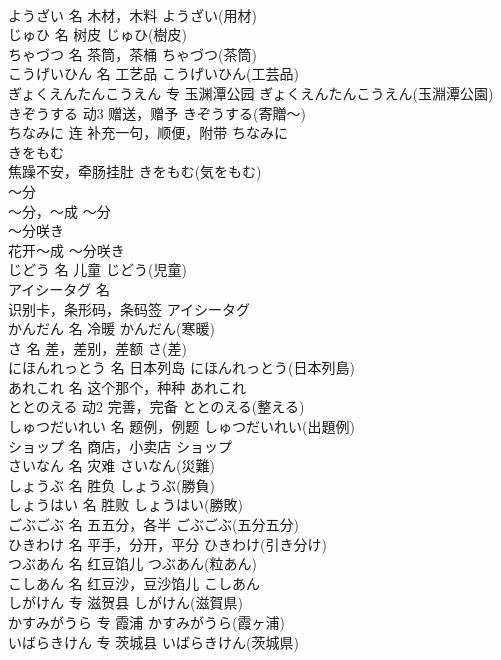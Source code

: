 \documentclass[8pt]{extreport}
\begin{document}
\begin{CJK}{UTF8}{min}
\\	ようざい	名	木材，木料	ようざい(用材)	
\\	じゅひ	名	树皮	じゅひ(樹皮)	
\\	ちゃづつ	名	茶筒，茶桶	ちゃづつ(茶筒)	
\\	こうげいひん	名	工艺品	こうげいひん(工芸品)	
\\	ぎょくえんたんこうえん	专	玉渊潭公园	ぎょくえんたんこうえん(玉淵潭公園)	
\\	きぞうする	动3	赠送，赠予	きぞうする(寄贈～)	
\\	ちなみに	连	补充一句，顺便，附带	ちなみに	
\\	きをもむ	
\\	焦躁不安，牵肠挂肚	きをもむ(気をもむ)	
\\	～分	
\\	～分，～成	～分	
\\	～分咲き	
\\	花开～成	～分咲き	
\\	じどう	名	儿童	じどう(児童)	
\\	アイシータグ	名	
\\	识别卡，条形码，条码签	アイシータグ
\\	かんだん	名	冷暖	かんだん(寒暖)	
\\	さ	名	差，差别，差额	さ(差)	
\\	にほんれっとう	名	日本列岛	にほんれっとう(日本列島)	
\\	あれこれ	名	这个那个，种种	あれこれ	
\\	ととのえる	动2	完善，完备	ととのえる(整える)	
\\	しゅつだいれい	名	题例，例题	しゅつだいれい(出題例)	
\\	ショップ	名	商店，小卖店	ショップ	
\\	さいなん	名	灾难	さいなん(災難)	
\\	しょうぶ	名	胜负	しょうぶ(勝負)	
\\	しょうはい	名	胜败	しょうはい(勝敗)	
\\	ごぶごぶ	名	五五分，各半	ごぶごぶ(五分五分)	
\\	ひきわけ	名	平手，分开，平分	ひきわけ(引き分け)	
\\	つぶあん	名	红豆馅儿	つぶあん(粒あん)	
\\	こしあん	名	红豆沙，豆沙馅儿	こしあん	
\\	しがけん	专	滋贺县	しがけん(滋賀県)	
\\	かすみがうら	专	霞浦	かすみがうら(霞ヶ浦)	
\\	いばらきけん	专	茨城县	いばらきけん(茨城県)	

\end{CJK}
\end{document}
